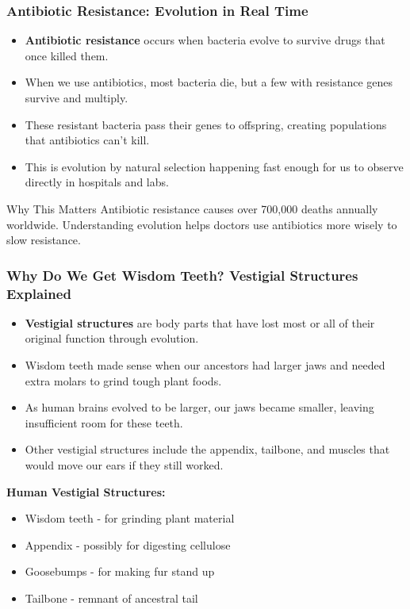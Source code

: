 \documentclass{beamer}
\begin{document}
	\begin{frame}
		\frametitle{Antibiotic Resistance: Evolution in Real Time}
		\begin{itemize}
			\item \textbf{Antibiotic resistance} occurs when bacteria evolve to survive drugs that once killed them.
			\item When we use antibiotics, most bacteria die, but a few with resistance genes survive and multiply.
			\item These resistant bacteria pass their genes to offspring, creating populations that antibiotics can't kill.
			\item This is evolution by natural selection happening fast enough for us to observe directly in hospitals and labs.
		\end{itemize}
		\begin{alertblock}{Why This Matters}
			Antibiotic resistance causes over 700,000 deaths annually worldwide. Understanding evolution helps doctors use antibiotics more wisely to slow resistance.
		\end{alertblock}
	\end{frame}
	
	\begin{frame}
		\frametitle{Why Do We Get Wisdom Teeth? Vestigial Structures Explained}
		\begin{itemize}
			\item \textbf{Vestigial structures} are body parts that have lost most or all of their original function through evolution.
			\item Wisdom teeth made sense when our ancestors had larger jaws and needed extra molars to grind tough plant foods.
			\item As human brains evolved to be larger, our jaws became smaller, leaving insufficient room for these teeth.
			\item Other vestigial structures include the appendix, tailbone, and muscles that would move our ears if they still worked.
		\end{itemize}
		\begin{example}
			\scriptsize
			\textbf{Human Vestigial Structures:}
			\begin{itemize}
				\item Wisdom teeth - for grinding plant material
				\item Appendix - possibly for digesting cellulose
				\item Goosebumps - for making fur stand up
				\item Tailbone - remnant of ancestral tail
			\end{itemize}
		\end{example}
	\end{frame}
	
\end{document}
